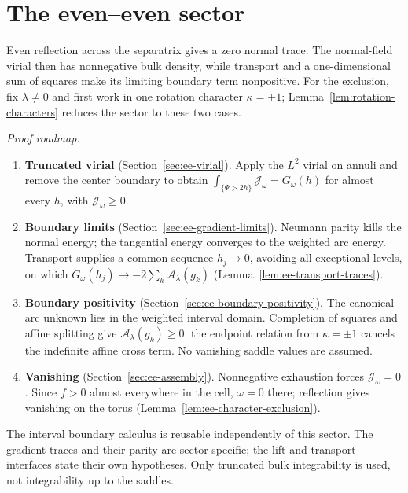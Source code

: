 \chapter{The even--even sector}
\label{chap:even-even}

Even reflection across the separatrix gives a zero normal trace.
The normal-field virial then has nonnegative bulk density, while transport
and a one-dimensional sum of squares make its limiting boundary term
nonpositive. For the exclusion, fix $\lambda\ne0$ and first work in one
rotation character $\kappa=\pm1$; Lemma~\ref{lem:rotation-characters}
reduces the sector to these two cases.

\emph{Proof roadmap.}
\begin{enumerate}
  \item \textbf{Truncated virial}
        (Section~\ref{sec:ee-virial}).
        Apply the $L^2$ virial on annuli and remove the center boundary to
        obtain $\int_{\{\Psi>2h\}}\mathcal J_\omega=G_\omega(h)$
        for almost every $h$, with $\mathcal J_\omega\ge0$.
  \item \textbf{Boundary limits}
        (Section~\ref{sec:ee-gradient-limits}).
        Neumann parity kills the normal energy; the tangential energy
        converges to the weighted arc energy. Transport supplies a common
        sequence $h_j\to0$, avoiding all exceptional levels, on which
        $G_\omega(h_j)\to-2\sum_k\mathcal A_\lambda(g_k)$
        (Lemma~\ref{lem:ee-transport-traces}).
  \item \textbf{Boundary positivity}
        (Section~\ref{sec:ee-boundary-positivity}).
        The canonical arc unknown lies in the weighted interval domain.
        Completion of squares and affine splitting give
        $\mathcal A_\lambda(g_k)\ge0$: the endpoint relation from
        $\kappa=\pm1$ cancels the indefinite affine cross term.
        No vanishing saddle values are assumed.
  \item \textbf{Vanishing}
        (Section~\ref{sec:ee-assembly}).
        Nonnegative exhaustion forces $\mathcal J_\omega=0$.
        Since $f>0$ almost everywhere in the cell, $\omega=0$ there;
        reflection gives vanishing on the torus
        (Lemma~\ref{lem:ee-character-exclusion}).
\end{enumerate}

The interval boundary calculus is reusable independently of this sector.
The gradient traces and their parity are sector-specific; the lift and
transport interfaces state their own hypotheses. Only truncated bulk
integrability is used, not integrability up to the saddles.

